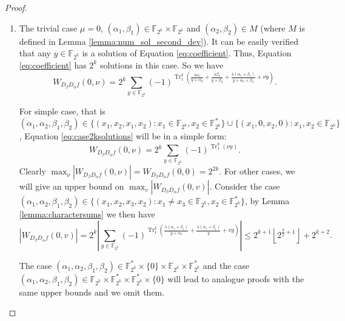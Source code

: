\documentclass{article}
\newcommand{\F}{\mathbb{F}}
\newcommand{\0}{\textbf{0}}
\newcommand{\1}{\textbf{1}}
\newcommand{\TRACE}{\operatorname{Tr}_1^k}
\theoremstyle{plain}
\begin{document}
\begin{proof}
        \begin{enumerate}[label=\textbf{Case \arabic*},wide = 0pt]
            \item The trivial case $\mu=0$, $(\alpha_1,\beta_1)\in\F_{2^k}\times\F_{2^k}$ and $(\alpha_2,\beta_2)\in M$ (where $M$ is defined in Lemma \ref{lemma:num_sol_second_dev}).
            It can be easily verified that any $y\in \F_{2^k}$ is a solution of Equation \eqref{eq:coefficient}.
            Thus, Equation \eqref{eq:coefficient} has $2^k$ solutions in this case.
            So we have
            \begin{equation}\label{eq:case2ksolutions}
                W_{D_{\beta}D_{\alpha}f}(0,\nu)=2^k\sum_{y\in\F_{2^k}}(-1)^{\TRACE\left(\frac{\lambda\alpha_1}{y+\alpha_2}+\frac{\lambda\beta_1}{y+\beta_2}+\frac{\lambda(\alpha_1+\beta_1)}{y+\alpha_2+\beta_2}+\nu y\right)}.
            \end{equation}
            
            
            For simple case, that is 
            $(\alpha_1,\alpha_2,\beta_1,\beta_2)\in\{(x_1,x_2,x_1,x_2):x_1\in\F_{2^k},x_2\in\F_{2^k}^*\}\cup\{(x_1,0,x_2,0):x_1,x_2\in\F_{2^k}\}$,
            Equation \eqref{eq:case2ksolutions} will be in a simple form:
            \[W_{D_{\beta}D_{\alpha}f}(0,\nu)=2^k\sum_{y\in\F_{2^k}}(-1)^{\TRACE\left(\nu y\right)}.\]
            Clearly $\max_{\nu}|W_{D_{\beta}D_{\alpha}f}(0,\nu)|=W_{D_{\beta}D_{\alpha}f}(0,0)=2^{2k}$.
            For other cases, we will give an upper bound on $\max_{v}|W_{D_{\beta}D_{\alpha}f}(0,v)|$.
            Consider the case $(\alpha_1,\alpha_2,\beta_1,\beta_2)\in\{(x_1,x_2,x_3,x_2):x_1\ne x_3\in\F_{2^k},x_2\in\F_{2^k}^*\}$, 
            by Lemma \ref{lemma:charactersums} we then have
            \[\left\lvert W_{D_{\beta}D_{\alpha}f}(0,v)\right\rvert =2^k\left\lvert \sum_{y\in\F_{2^k}}(-1)^{\TRACE\left(\frac{\lambda(\alpha_1+\beta_1)}{y+\alpha_2}+\frac{\lambda(\alpha_1+\beta_1)}{y}+vy\right)}\right\rvert\le 2^{k+1}\left\lfloor 2^{\frac{k}{2}+1}\right\rfloor+2^{k+2}.\]
            
            The case $(\alpha_1,\alpha_2,\beta_1,\beta_2)\in\F_{2^k}^*\times\{0\}\times\F_{2^k}\times\F_{2^k}^*$ and the case $(\alpha_1,\alpha_2,\beta_1,\beta_2)\in\F_{2^k}\times\F_{2^k}^*\times\F_{2^k}^*\times\{0\}$ will lead to analogue proofs with the same upper bounds and we omit them.


\end{enumerate}
\end{proof}
\end{document}

